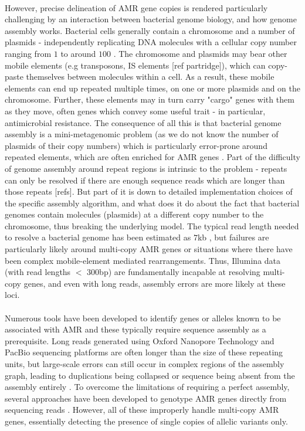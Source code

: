 \paragraph{}
However, precise delineation of AMR gene copies is rendered particularly challenging by an interaction between bacterial genome biology, and how genome assembly works. Bacterial cells generally contain a chromosome and a number of plasmids - independently replicating DNA molecules with a cellular copy number ranging from $1$ to around $100$ \cite{}. The chromosome and plasmids may bear other mobile elements (e.g transposons, IS elements [ref partridge]), which can copy-paste  themselves between molecules within a cell. As a result, these mobile elements can end up repeated multiple times, on one or more plasmids and on the chromosome. Further, these elements may in turn carry "cargo" genes with them as they move, often genes which convey some useful trait - in particular, antimicrobial resistance. The consequence of all this is that bacterial genome assembly is a mini-metagenomic problem (as we do not know the number of plasmids of their copy numbers) which is particularly error-prone around repeated elements, which are often enriched for AMR genes \cite{10.1038/s41576-019-0108-4}. Part of the difficulty of genome assembly around repeat regions is intrinsic to the problem - repeats can only be resolved if there are enough sequence reads which are longer than those repeats [refs]. But part of it is down to detailed implementation choices of the specific assembly algorithm, and what does it do about the fact that bacterial genomes contain molecules (plasmids) at a different copy number to the chromosome, thus breaking the underlying model.  The typical read length needed to resolve a bacterial genome has been estimated as $7$kb \cite{KOREN2015110}, but failures are particularly likely around multi-copy AMR genes or situations where there have been complex mobile-element mediated rearrangements. Thus, Illumina data (with read lengths $<$ 300bp) are fundamentally incapable at resolving multi-copy genes, and even with long reads, assembly errors are more likely at these loci.  
\paragraph{}
Numerous tools have been developed to identify genes or alleles known to be associated with AMR \cite{Feldgarden2021, Bortolaia2020, 10.1093.nar.gkz935, Seemann2023, Hunt2017, Bradley2015} and these typically require sequence assembly as a prerequisite. Long reads generated using Oxford Nanopore Technology and PacBio sequencing platforms are often longer than the size of these repeating units, but large-scale errors can still occur in complex regions of the assembly graph, leading to duplications being collapsed or sequence being absent from the assembly entirely \cite{10.12688/f1000research.21782.1, 10.1186/s13059-021-02483-z, FosterNyarko2023}.  To overcome the limitations of requiring a perfect assembly, several approaches have been developed to genotype AMR genes directly from sequencing reads \cite{Bortolaia2020, Bradley2015, Hunt2017}. However, all of these improperly handle multi-copy AMR genes, essentially detecting the presence of single copies of allelic variants only.
